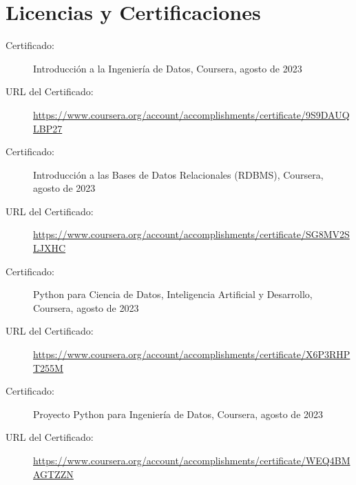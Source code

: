 \documentclass[a4paper,10pt]{article}
\begin{document}
\section*{Licencias y Certificaciones}
\begin{description}
    \item[Certificado:] Introducción a la Ingeniería de Datos, Coursera, agosto de 2023
    \item[URL del Certificado:] \url{https://www.coursera.org/account/accomplishments/certificate/9S9DAUQLBP27}
\end{description}

\vspace{1pt} %

\begin{description}
    \item[Certificado:] Introducción a las Bases de Datos Relacionales (RDBMS), Coursera, agosto de 2023
    \item[URL del Certificado:] \url{https://www.coursera.org/account/accomplishments/certificate/SG8MV2SLJXHC}
\end{description}

\vspace{1pt} %

\begin{description}
    \item[Certificado:] Python para Ciencia de Datos, Inteligencia Artificial y Desarrollo, Coursera, agosto de 2023
    \item[URL del Certificado:] \url{https://www.coursera.org/account/accomplishments/certificate/X6P3RHPT255M}
\end{description}

\vspace{1pt} %

\begin{description}
    \item[Certificado:] Proyecto Python para Ingeniería de Datos, Coursera, agosto de 2023
    \item[URL del Certificado:]\url{https://www.coursera.org/account/accomplishments/certificate/WEQ4BMAGTZZN}
\end{description}

\vspace{1pt} %
\end{document}
